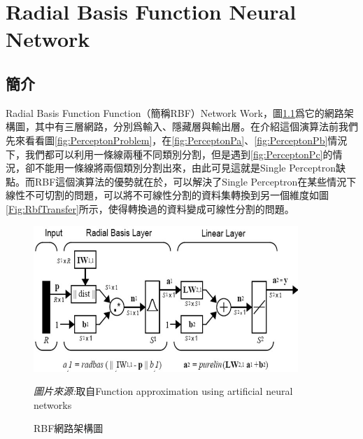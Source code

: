 \chapter{Radial Basis Function Neural Network}
\label{chapter:rbf}
\section{簡介}
Radial Basis Function Function（簡稱RBF）Network Work，圖\ref{fig:RbfNetwork}爲它的網路架構圖，其中有三層網路，分別爲輸入、隱藏層與輸出層。在介紹這個演算法前我們先來看看圖\ref{fig:PerceptonProblem}，在\ref{fig:PerceptonPa}、\ref{fig:PerceptonPb}情況下，我們都可以利用一條線兩種不同類別分割，但是遇到\ref{fig:PerceptonPc}的情況，卻不能用一條線將兩個類別分割出來，由此可見這就是Single Perceptron缺點。而RBF這個演算法的優勢就在於，可以解決了Single Perceptron在某些情況下線性不可切割的問題，可以將不可線性分割的資料集轉換到另一個維度如圖\ref{Fig:RbfTransfer}所示，使得轉換過的資料變成可線性分割的問題。
\begin{figure}[htbp]
	\centering
	\centerline{\includegraphics[width=10cm]{pic/rbf_struct.png}}
	\caption{RBF網路架構圖}
	\begin{minipage}{.7\linewidth}
		\footnotesize
		\emph{圖片來源:}取自Function approximation using artificial neural networks
	\end{minipage}
	\label{fig:RbfNetwork}
\end{figure}

